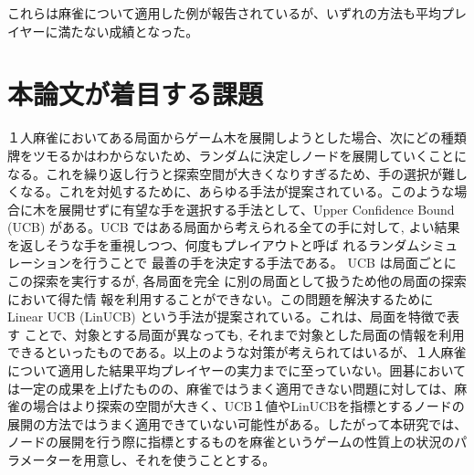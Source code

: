 これらは麻雀について適用した例が報告されている\cite{LinUCB_mahjong}が、いずれの方法も平均プレイヤーに満たない成績となった。

\section{本論文が着目する課題}
１人麻雀においてある局面からゲーム木を展開しようとした場合、次にどの種類牌をツモるかはわからないため、ランダムに決定しノードを展開していくことになる。これを繰り返し行うと探索空間が大きくなりすぎるため、手の選択が難しくなる。これを対処するために、あらゆる手法が提案されている。このような場合に木を展開せずに有望な手を選択する手法として、Upper Confidence Bound (UCB) \cite{UCB}がある。UCB ではある局面から考えられる全ての手に対して, よい結果 を返しそうな手を重視しつつ、何度もプレイアウトと呼ば れるランダムシミュレーションを行うことで 最善の手を決定する手法である。
UCB は局面ごとにこの探索を実行するが, 各局面を完全 に別の局面として扱うため他の局面の探索において得た情 報を利用することができない。この問題を解決するためにLinear UCB (LinUCB) \cite{LinUCB} という手法が提案されている。これは、局面を特徴で表す ことで、対象とする局面が異なっても, それまで対象とした局面の情報を利用できるといったものである。以上のような対策が考えられてはいるが、１人麻雀について適用した結果平均プレイヤーの実力までに至っていない。囲碁においては一定の成果を上げたものの、麻雀ではうまく適用できない問題に対しては、麻雀の場合はより探索の空間が大きく、UCB１値やLinUCBを指標とするノードの展開の方法ではうまく適用できていない可能性がある。したがって本研究では、ノードの展開を行う際に指標とするものを麻雀というゲームの性質上の状況のパラメーターを用意し、それを使うこととする。

